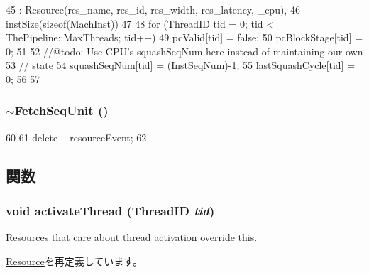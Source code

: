 \begin{DoxyCode}
45     : Resource(res_name, res_id, res_width, res_latency, _cpu),
46       instSize(sizeof(MachInst))
47 {
48     for (ThreadID tid = 0; tid < ThePipeline::MaxThreads; tid++) {
49         pcValid[tid] = false;
50         pcBlockStage[tid] = 0;
51 
52         //@todo: Use CPU's squashSeqNum here instead of maintaining our own
53         // state
54         squashSeqNum[tid] = (InstSeqNum)-1;
55         lastSquashCycle[tid] = 0;
56     }
57 }
\end{DoxyCode}
\hypertarget{classFetchSeqUnit_ab25f7626363f6e2ac1e2e1b838d9f74a}{
\subsubsection[{$\sim$FetchSeqUnit}]{\setlength{\rightskip}{0pt plus 5cm}$\sim${\bf FetchSeqUnit} ()}}
\label{classFetchSeqUnit_ab25f7626363f6e2ac1e2e1b838d9f74a}



\begin{DoxyCode}
60 {
61     delete [] resourceEvent;
62 }
\end{DoxyCode}


\subsection{関数}
\hypertarget{classFetchSeqUnit_a687aa4600423bb30ecf3bb1da6cd6000}{
\subsubsection[{activateThread}]{\setlength{\rightskip}{0pt plus 5cm}void activateThread ({\bf ThreadID} {\em tid})}}
\label{classFetchSeqUnit_a687aa4600423bb30ecf3bb1da6cd6000}
Resources that care about thread activation override this. 

\hyperlink{classResource_ab75d2f4e158982d66b44263d96cdd058}{Resource}を再定義しています。


